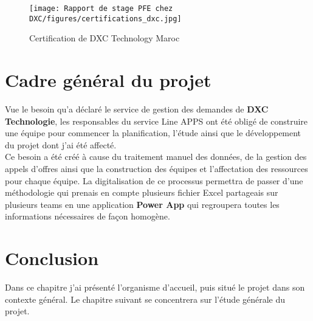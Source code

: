\begin{figure}[!h]
    \centering
    \texttt{[image: Rapport de stage PFE chez DXC/figures/certifications\_dxc.jpg]}
    \caption{Certification de DXC Technology Maroc}
\end{figure}

\section{Cadre général du projet }
Vue le besoin qu’a déclaré le service de gestion des demandes de \textbf{DXC Technologie}, les responsables du service Line APPS ont été obligé de construire une équipe pour commencer la planification, l’étude ainsi que le développement du projet dont j’ai été affecté. 
\\
Ce besoin a été créé à cause du traitement manuel des données, de la gestion des appels d’offres ainsi que la construction des équipes et l’affectation des ressources pour chaque équipe. La digitalisation de ce processus permettra de passer d'une méthodologie qui prenais en compte plusieurs fichier Excel partageais sur plusieurs teams en une application \textbf{Power App} qui regroupera toutes les informations nécessaires de façon homogène.


\section{Conclusion}
Dans ce chapitre j’ai présenté l’organisme d’accueil, puis situé le projet dans son contexte général. Le chapitre suivant se concentrera sur l’étude générale du projet.


